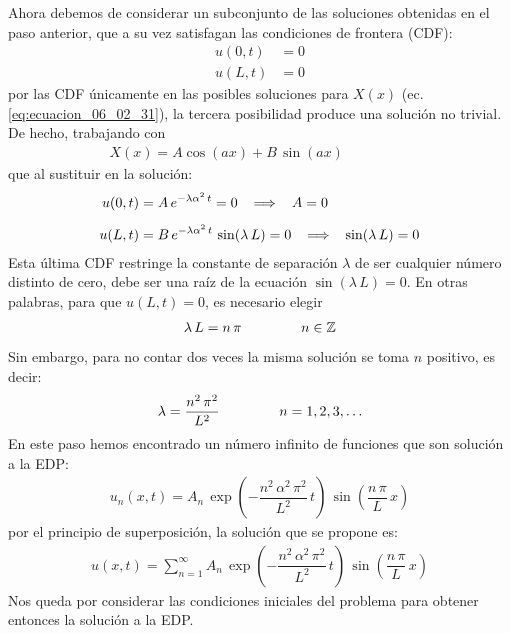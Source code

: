 Ahora debemos de considerar un subconjunto de las soluciones obtenidas en el paso anterior, que a su vez satisfagan las condiciones de frontera (CDF):
\begin{align*}
u(0, t) &= 0 \\[0.5em]
u(L, t) &= 0
\end{align*}
por las CDF únicamente en las posibles soluciones para $X(x)$ (ec. \ref{eq:ecuacion_06_02_31}), la tercera posibilidad produce una solución no trivial. De hecho, trabajando con
\begin{align*}
X(x) = A \cos (a x) + B \, \sin (a x) \hspace{2cm}
\end{align*}
que al sustituir en la solución:
\begin{align*}
u(0, t) &= A \, e^{-\lambda \alpha^{2} \, t} = 0 \hspace{0.3cm} \Longrightarrow \hspace{0.3cm} A = 0 \\[0.5em]
u(L, t) &= B \, e^{-\lambda \alpha^{2} \, t} \, \sin (\lambda \, L) = 0 \hspace{0.3cm} \Longrightarrow \hspace{0.3cm} \sin (\lambda \, L) = 0
\end{align*}
Esta última CDF restringe la constante de separación $\lambda$ de ser cualquier número distinto de cero, debe ser una raíz de la ecuación $\sin (\lambda \, L) = 0$. En otras palabras, para que $u(L, t) = 0$, es necesario elegir
\begin{align}
\lambda \, L = n \, \pi \hspace{1.5cm} n \in \mathbb{Z}
\label{eq:ecuacion_06_02_34}    
\end{align}
Sin embargo, para no contar dos veces la misma solución se toma $n$ positivo, es decir:
\begin{align}
\lambda = \dfrac{n^{2} \, \pi^{2}}{L^{2}} \hspace{1.5cm} n = 1, 2, 3, \ldots
\label{eq:ecuacion_06_02_35}
\end{align}
En este paso hemos encontrado un número infinito de funciones que son solución a la EDP:
\begin{align}
u_{n} (x, t) = A_{n} \, \exp \left( - \dfrac{n^{2} \, \alpha^{2} \, \pi^{2}}{L^{2}} \, t \right) \, \sin \left( \dfrac{n \, \pi}{L} \, x \right)
\label{eq:ecuacion_06_02_37}    
\end{align}
por el principio de superposición, la solución que se propone es:
\begin{align}
u (x, t) = \sum_{n=1}^{\infty} A_{n} \, \exp \left( - \dfrac{n^{2} \, \alpha^{2} \, \pi^{2}}{L^{2}} \, t \right) \, \sin \left( \dfrac{n \, \pi}{L} \, x \right)
\label{eq:ecuacion_06_02_38}
\end{align}
Nos queda por considerar las condiciones iniciales del problema para obtener entonces la solución a la EDP.

